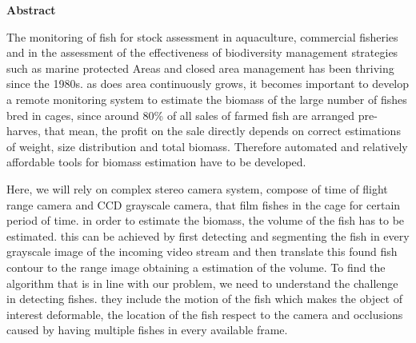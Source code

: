 

\clearemptydoublepage
{}
{}	





\vspace*{2cm}
\begin{center}
{\Large \bf Abstract}
\end{center}
\vspace{1cm}

The monitoring of fish for stock assessment in aquaculture, commercial fisheries 
and in the assessment of the effectiveness of biodiversity management strategies 
such as marine protected Areas and closed area management has been thriving since the 1980s.
as does area continuously grows, it becomes important to develop a remote monitoring 
system to estimate the biomass of the large number of fishes bred in cages,
since around 80\% of all sales of farmed fish are arranged pre-harves,
that mean, the profit on the sale directly depends on correct estimations of weight,
size distribution and total biomass.
Therefore automated and relatively affordable tools for biomass estimation have to be developed.

Here, we will rely on complex stereo camera system,
compose of time of flight range camera and CCD grayscale camera,
that film fishes in the cage for certain period of time.
in order to estimate the biomass, the volume of the fish has to be estimated. 
this can be achieved by first detecting and segmenting the fish in every grayscale 
image of the incoming video stream and then translate this found fish contour  
to the range image obtaining a estimation of the volume.
To find the algorithm that is in line with our problem,
we need to understand the challenge in detecting fishes.
they include the motion of the fish which makes the object of interest deformable,
the location of the fish respect to the camera and occlusions caused by having 
multiple fishes in every available frame.

